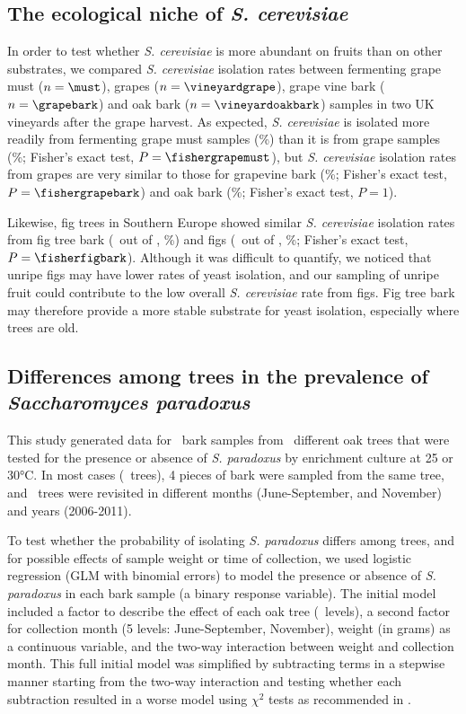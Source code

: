 \documentclass[12pt]{article}
\begin{document}
\subsection*{The ecological niche of \textit{S. cerevisiae}}

In order to test whether \textit{S. cerevisiae} is more abundant on fruits than on other substrates, we compared \textit{S. cerevisiae} isolation rates between fermenting grape must ($n=\must$), grapes ($n=\vineyardgrape$), grape vine bark ($n=\grapebark$) and oak bark ($n=\vineyardoakbark$) samples in two UK vineyards after the grape harvest. As expected, \textit{S. cerevisiae} is isolated more readily from fermenting grape must samples (\scmustpcent\%) than it is from grape samples (\scgrapepcent\%; Fisher's exact test, $P=\fishergrapemust$), but \textit{S. cerevisiae} isolation rates from grapes are very similar to those for grapevine bark (\scvinebarkpcent\%; Fisher's exact test, $P=\fishergrapebark$) and oak bark (\scvineyardoakbarkpcent\%; Fisher's exact test, $P=1$). 

Likewise, fig trees in Southern Europe showed similar \textit{S. cerevisiae} isolation rates from fig tree bark (\scfigbark\ out of \figbark, \scfigbarkpcent\%) and figs (\scfigfig\ out of \figfig, \scfigfigpcent\%; Fisher's exact test, $P=\fisherfigbark$). Although it was difficult to quantify, we noticed that unripe figs may have lower rates of yeast isolation, and our sampling of unripe fruit could contribute to the low overall \textit{S. cerevisiae} rate from figs. Fig tree bark may therefore provide a more stable substrate for yeast isolation, especially where trees are old.


\subsection*{Differences among trees in the prevalence of \textit{Saccharomyces paradoxus}}

This study generated data for \oakbarknotten\ bark samples from \treecount\ different oak trees that were tested for the presence or absence of \textit{S. paradoxus} by enrichment culture at 25 or 30\si{\degreeCelsius}. In most cases (\treessampledfourtimes\ trees), 4 pieces of bark were sampled from the same tree, and \repeatedtrees\ trees were revisited in different months (June-September, and November) and years (2006-2011). 

To test whether the probability of isolating \textit{S. paradoxus} differs among trees, and for possible effects of sample weight or time of collection, we used logistic regression (GLM with binomial errors) to model the presence or absence of \textit{S. paradoxus} in each bark sample (a binary response variable). The initial model included a factor to describe the effect of each oak tree (\treecount\ levels), a second factor for collection month (5 levels: June-September, November), weight (in grams) as a continuous variable, and the two-way interaction between weight and collection month. This full initial model was simplified by subtracting terms in a stepwise manner starting from the two-way interaction and testing whether each subtraction resulted in a worse model using $\chi^2$ tests as recommended in \citet{crawley_statistics:_2005}.
\end{document}
